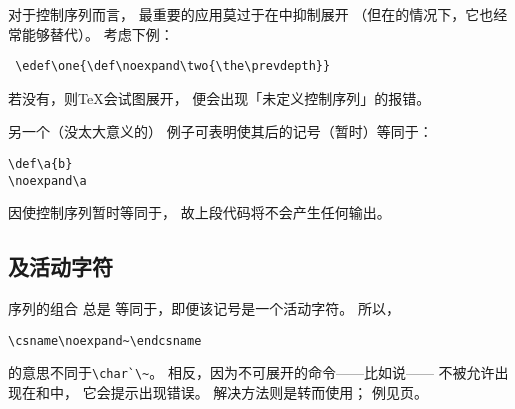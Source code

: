 \documentclass{book}
\begin{document}
对于控制序列而言，
最重要的应用莫过于在中抑制展开
（但在的情况下，它也经常能够替代）。
考虑下例：
\begin{verbatim}
 \edef\one{\def\noexpand\two{\the\prevdepth}}
\end{verbatim}
若没有，则{\TeX}会试图展开，
便会出现「未定义控制序列」的报错。

另一个（没太大意义的）
例子可表明使其后的记号（暂时）等同于：
\begin{verbatim}
\def\a{b}
\noexpand\a
\end{verbatim}
因使控制序列暂时等同于，
故上段代码将不会产生任何输出。

\subsection{\protect{}及活动字符}

序列的组合
总是%
等同于，即便该记号是一个活动字符。
所以，
\begin{verbatim}
\csname\noexpand~\endcsname
\end{verbatim}
的意思不同于\verb>\char`\~>。
相反，因为不可展开的命令——比如说——
不被允许出现在和中，
它会提示出现错误。
解决方法则是转而使用；
例见\pageref{store:cat}页。
\end{document}
